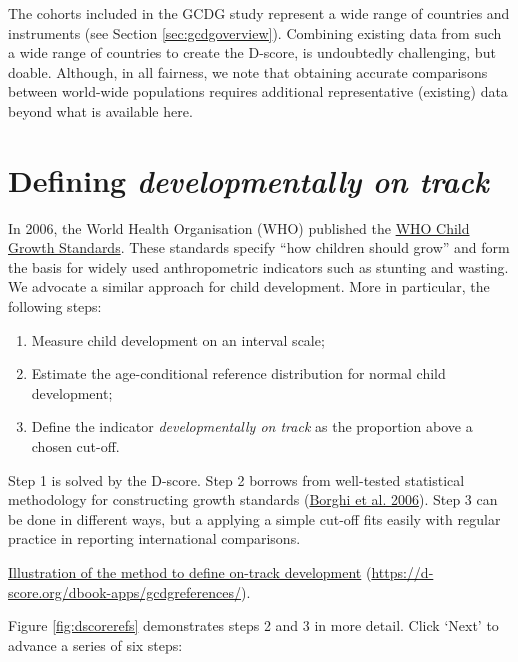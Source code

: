 \documentclass[
]{book}
\providecommand{\tightlist}{%
  \setlength{\itemsep}{0pt}\setlength{\parskip}{0pt}}
\begin{document}
The cohorts included in the GCDG study represent a wide range of countries and instruments (see Section \ref{sec:gcdgoverview}). Combining existing data from such a wide range of countries to create the D-score, is undoubtedly challenging, but doable. Although, in all fairness, we note that obtaining accurate comparisons between world-wide populations requires additional representative (existing) data beyond what is available here.

\hypertarget{sec:references}{%
\section{\texorpdfstring{Defining \emph{developmentally on track}}{Defining developmentally on track}}\label{sec:references}}

In 2006, the World Health Organisation (WHO) published the \href{https://www.who.int/childgrowth/publications/technical_report_pub/en/}{WHO Child Growth Standards}. These standards specify ``how children should grow'' and form the basis for widely used anthropometric indicators such as stunting and wasting. We advocate a similar approach for child development. More in particular, the following steps:

\begin{enumerate}
\def\labelenumi{\arabic{enumi}.}
\tightlist
\item
  Measure child development on an interval scale;
\item
  Estimate the age-conditional reference distribution for normal child development;
\item
  Define the indicator \emph{developmentally on track} as the proportion above a chosen cut-off.
\end{enumerate}

Step 1 is solved by the D-score. Step 2 borrows from well-tested statistical methodology for constructing growth standards (\protect\hyperlink{ref-borghi2006}{Borghi et al. 2006}). Step 3 can be done in different ways, but a applying a simple cut-off fits easily with regular practice in reporting international comparisons.

\label{fig:dscorerefs}\href{https://d-score.org/dbook-apps/gcdgreferences/}{Illustration of the method to define on-track development} (\url{https://d-score.org/dbook-apps/gcdgreferences/}).



Figure \ref{fig:dscorerefs} demonstrates steps 2 and 3 in more detail. Click `Next' to advance a series of six steps:
\end{document}
